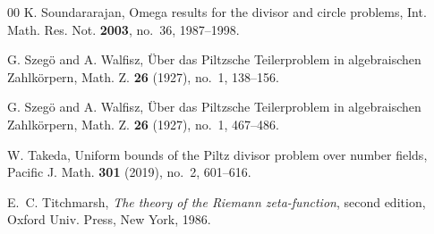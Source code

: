 \documentclass[reqno]{amsart}
\numberwithin{equation}{section}
\theoremstyle{plain}
\begin{document}
\begin{thebibliography}{00}
		 K. Soundararajan, {Omega results for the divisor and circle problems}, Int. Math. Res. Not. {\bf 2003}, no.~36, 1987--1998.
		
		 G. Szeg\"o{} and A. Walfisz, \"Uber das Piltzsche Teilerproblem in algebraischen Zahlk\"orpern, Math. Z. {\bf 26} (1927), no.~1, 138--156.
		
		 G. Szeg\"o{} and A. Walfisz, \"Uber das Piltzsche Teilerproblem in algebraischen Zahlk\"orpern, Math. Z. {\bf 26} (1927), no.~1, 467--486.
		
		 W. Takeda, Uniform bounds of the Piltz divisor problem over number fields, Pacific J. Math. {\bf 301} (2019), no.~2, 601--616.
		
		
		 E.~C. Titchmarsh, {\it The theory of the Riemann zeta-function}, second edition, 
		Oxford Univ. Press, New York, 1986.
%		
	\end{thebibliography}
\end{document}
